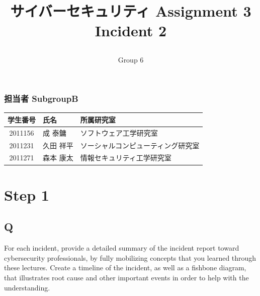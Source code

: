 \documentclass[uplatex]{jsarticle}
\title{
    \vspace{-1.5cm}
    サイバーセキュリティ Assignment 3 \\
    Incident 2
    \author{Group 6}
}
\begin{document}
\maketitle

\subsubsection*{担当者 SubgroupB}
\begin{table}[H]
    \begin{tabular}{|c|l|l|}
        \hline
        学生番号 & 氏名 & 所属研究室\\
        \hline\hline
        2011156 & 成 泰鏞 & ソフトウェア工学研究室\\
        \hline
        2011231 & 久田 祥平 & ソーシャルコンピューティング研究室\\
        \hline
        2011271 & 森本 康太 & 情報セキュリティ工学研究室\\
        \hline
    \end{tabular}
\end{table}

\section*{Step 1}
\subsection*{Q}
For each incident, provide a detailed summary of the incident report toward cybersecurity professionals, by fully mobilizing concepts that you learned through these lectures. Create a timeline of the incident, as well as a fishbone diagram, that illustrates root cause and other important events in order to help with the understanding.
\end{document}
